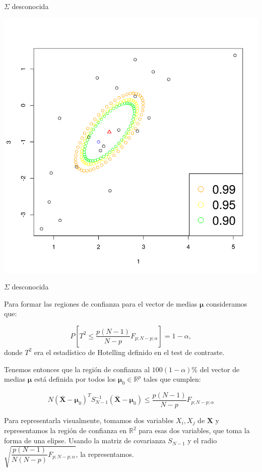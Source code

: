 \documentclass[xcolor=table]{beamer}
\begin{document}
\begin{frame}[fragile]{$\Sigma$ desconocida}

\begin{center}
\includegraphics[scale=0.4]{superficie1.png}
\end{center}
\end{frame}


\begin{frame}[fragile]{$\Sigma$ desconocida}

Para formar las regiones de confianza para el vector de medias $\pmb{\mu}$ consideramos que:

$$P\left[T^2 \leq \dfrac{p(N-1)}{N-p} F_{p;N-p;\alpha}\right]= 1 - \alpha,$$
donde $T^2$ era el estadístico de Hotelling definido en el test de contraste.

Tenemos entonces que la región de confianza al $100(1 - \alpha)\%$ del vector de medias $\pmb{\mu}$ está definida por todos los $\pmb{\mu}_0 \in \mathbb{R}^p$ tales que cumplen:

$$N (\pmb{\bar{X}} - \pmb{\mu}_0)^T S_{N-1}^{-1}(\pmb{\bar{X}} - \pmb{\mu}_0) \leq \dfrac{p(N-1)}{N-p} F_{p;N-p;\alpha} $$

Para representarla visualmente, tomamos dos variables $X_i,X_j$ de $\pmb{X}$ y representamos la región de confianza en $\mathbb{R}^2$ para esas dos variables, que toma la forma de una elipse. Usando la matriz de covarianza $S_{N-1}$ y el radio $\sqrt{\dfrac{p(N-1)}{N(N-p)} F_{p;N-p;\alpha}}$, la representamos.

\end{frame}
\end{document}

